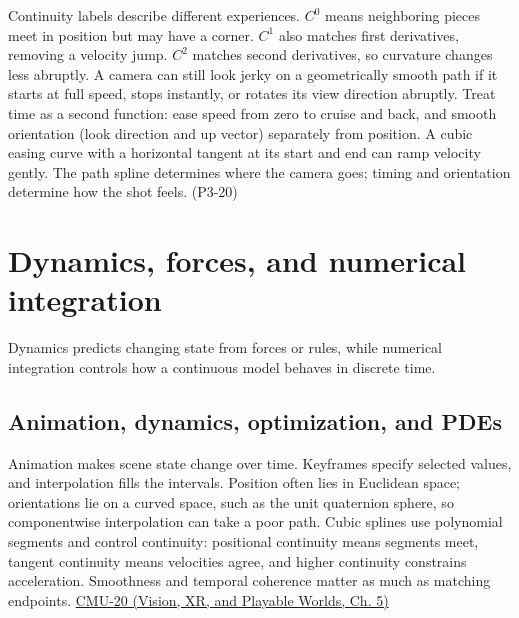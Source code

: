 Continuity labels describe different experiences. \(C^0\) means neighboring pieces meet in position but may have a corner. \(C^1\) also matches first derivatives, removing a velocity jump. \(C^2\) matches second derivatives, so curvature changes less abruptly. A camera can still look jerky on a geometrically smooth path if it starts at full speed, stops instantly, or rotates its view direction abruptly. Treat time as a second function: ease speed from zero to cruise and back, and smooth orientation (look direction and up vector) separately from position. A cubic easing curve with a horizontal tangent at its start and end can ramp velocity gently. The path spline determines where the camera goes; timing and orientation determine how the shot feels. (P3-20)

\section{Dynamics, forces, and numerical integration}\label{04-visual-computing-ii-ch029-dynamics-forces-and-numerical-integration}

Dynamics predicts changing state from forces or rules, while numerical integration controls how a continuous model behaves in discrete time.

\subsection{Animation, dynamics, optimization, and PDEs}\label{04-visual-computing-ii-ch029-animation-dynamics-optimization-and-pdes}

Animation makes scene state change over time. Keyframes specify selected values, and interpolation fills the intervals. Position often lies in Euclidean space; orientations lie on a curved space, such as the unit quaternion sphere, so componentwise interpolation can take a poor path. Cubic splines use polynomial segments and control continuity: positional continuity means segments meet, tangent continuity means velocities agree, and higher continuity constrains acceleration. Smoothness and temporal coherence matter as much as matching endpoints. \href{../07-Vision-XR-and-Playable-Worlds/main.pdf\#nameddest=04-visual-computing-ii-ch036-cmu-20---introduction-to-animation}{CMU-20 (Vision, XR, and Playable Worlds, Ch. 5)}

